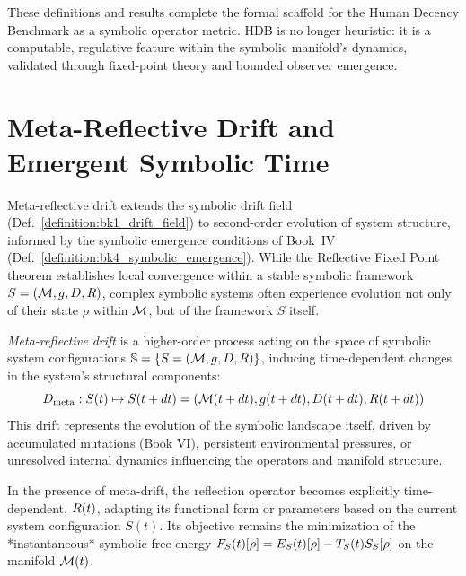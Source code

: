 \begin{remark}
\label{remark:bk7_hdb_closure}
These definitions and results complete the formal scaffold for the Human Decency Benchmark as a symbolic operator metric. HDB is no longer heuristic: it is a computable, regulative feature within the symbolic manifold's dynamics, validated through fixed-point theory and bounded observer emergence.
\end{remark}

\section{Meta-Reflective Drift and Emergent Symbolic Time}
\label{sec:bk7_meta_reflective_drift_and_emergent_symbolic_time}

Meta-reflective drift extends the symbolic drift field (Def.~\ref{definition:bk1_drift_field}) to second-order evolution of system structure, informed by the symbolic emergence conditions of Book~IV (Def.~\ref{definition:bk4_symbolic_emergence}).
While the Reflective Fixed Point theorem establishes local convergence within a stable symbolic framework \(S = (\mathcal{M}, g, D, R)\), complex symbolic systems often experience evolution not only of their state \(\rho\) within \(\mathcal{M}\), but of the framework \(S\) itself.
\begin{definition}
\label{definition:bk7_meta_reflective_drift__meta}
\emph{Meta-reflective drift} is a higher-order process acting on the space of symbolic system configurations \(\mathbb{S} = \{ S = (\mathcal{M}, g, D, R) \}\), inducing time-dependent changes in the system's structural components:
\[
D_{\mathrm{meta}} : S(t) \mapsto S(t+dt) = (\mathcal{M}(t+dt), g(t+dt), D(t+dt), R(t+dt))
\]
This drift represents the evolution of the symbolic landscape itself, driven by accumulated mutations (Book VI), persistent environmental pressures, or unresolved internal dynamics influencing the operators and manifold structure.
\end{definition}
\begin{definition}
\label{definition:bk7_adaptive_reflection_operator_t}
In the presence of meta-drift, the reflection operator becomes explicitly time-dependent, \(R(t)\), adapting its functional form or parameters based on the current system configuration \(S(t)\). Its objective remains the minimization of the *instantaneous* symbolic free energy \(F_S(t)[\rho] = E_S(t)[\rho] - T_S(t) S_S[\rho]\) on the manifold \(\mathcal{M}(t)\).
\end{definition}
